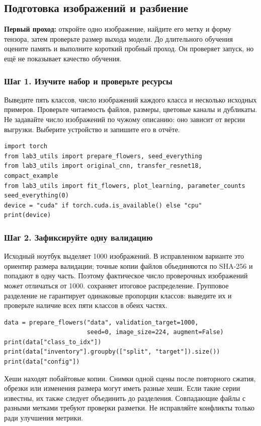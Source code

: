 \subsection{Подготовка изображений и разбиение}
\textbf{Первый проход:} откройте одно изображение, найдите его метку и форму тензора, затем проверьте размер выхода модели. До длительного обучения оцените память и выполните короткий пробный проход. Он проверяет запуск, но ещё не показывает качество обучения.

\subsubsection*{Шаг 1. Изучите набор и проверьте ресурсы}
Выведите пять классов, число изображений каждого класса и несколько исходных примеров. Проверьте читаемость файлов, размеры, цветовые каналы и дубликаты. Не задавайте число изображений по чужому описанию: оно зависит от версии выгрузки. Выберите устройство и запишите его в отчёте.
\begin{lstlisting}
import torch
from lab3_utils import prepare_flowers, seed_everything
from lab3_utils import original_cnn, transfer_resnet18, compact_example
from lab3_utils import fit_flowers, plot_learning, parameter_counts
seed_everything(0)
device = "cuda" if torch.cuda.is_available() else "cpu"
print(device)
\end{lstlisting}

\subsubsection*{Шаг 2. Зафиксируйте одну валидацию}
Исходный ноутбук выделяет 1000 изображений. В исправленном варианте это ориентир размера валидации; точные копии файлов объединяются по SHA-256 и попадают в одну часть. Поэтому фактическое число проверочных изображений может отличаться от 1000.  сохраняет итоговое распределение. Групповое разделение не гарантирует одинаковые пропорции классов: выведите их и проверьте наличие всех пяти классов в обеих частях.
\begin{lstlisting}
data = prepare_flowers("data", validation_target=1000,
                       seed=0, image_size=224, augment=False)
print(data["class_to_idx"])
print(data["inventory"].groupby(["split", "target"]).size())
print(data["config"])
\end{lstlisting}

Хеши находят побайтовые копии. Снимки одной сцены после повторного сжатия, обрезки или изменения размера могут иметь разные хеши. Если такие серии известны, их также следует объединить до разделения. Совпадающие файлы с разными метками требуют проверки разметки. Не исправляйте конфликты только ради улучшения метрики.

